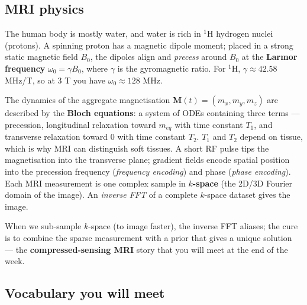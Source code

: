 \documentclass[11pt,a4paper]{article}
\begin{document}
\subsection{MRI physics}

The human body is mostly water, and water is rich in $^1$H
hydrogen nuclei (protons). A spinning proton has a magnetic dipole
moment; placed in a strong static magnetic field $B_0$, the dipoles
align and \emph{precess} around $B_0$ at the
\textbf{Larmor frequency} $\omega_0 = \gamma B_0$, where $\gamma$ is
the gyromagnetic ratio. For $^1$H, $\gamma \approx 42.58$ MHz/T, so
at 3 T you have $\omega_0 \approx 128$ MHz.

The dynamics of the aggregate magnetisation
$\mathbf{M}(t) = (m_x, m_y, m_z)$ are described by the
\textbf{Bloch equations}: a system of ODEs containing three terms ---
precession, longitudinal relaxation toward $m_{eq}$ with time
constant $T_1$, and transverse relaxation toward $0$ with time
constant $T_2$. $T_1$ and $T_2$ depend on tissue, which is why MRI
can distinguish soft tissues. A short RF pulse tips
the magnetisation into the transverse plane; gradient fields encode
spatial position into the precession frequency
(\emph{frequency encoding}) and phase
(\emph{phase encoding}). Each MRI measurement is one complex sample
in \textbf{$k$-space} (the 2D/3D Fourier domain of the image). An
\emph{inverse FFT} of a complete $k$-space dataset gives the image.

When we sub-sample $k$-space (to image faster), the inverse FFT
aliases; the cure is to combine the sparse measurement with a prior
that gives a unique solution --- the
\textbf{compressed-sensing MRI} story that you will meet at the end
of the week.

\subsection{Vocabulary you will meet}
\end{document}
